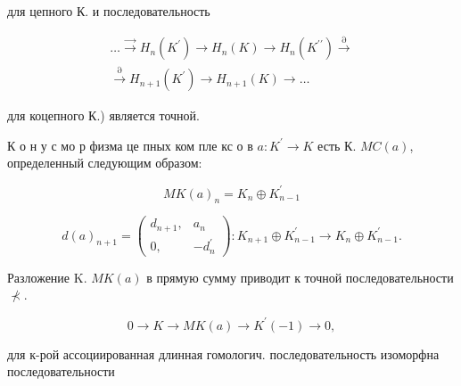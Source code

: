 \documentclass[10pt]{article}
\begin{document}
для цепного К. и последовательность



\[

\begin{gathered}

\ldots \stackrel{\longrightarrow}{\longrightarrow} H_{n}\left(K^{\prime}\right) \longrightarrow H_{n}(K) \longrightarrow H_{n}\left(K^{\prime \prime}\right) \stackrel{\partial}{\longrightarrow} \\

\stackrel{\partial}{\longrightarrow} H_{n+1}\left(K^{\prime}\right) \longrightarrow H_{n+1}(K) \longrightarrow \ldots

\end{gathered}

\]



для коцепного К.) является точной.



К о н у с мо р физма це пных ком пле кс о в $a: K^{\prime} \rightarrow K$ есть К. $M C(a)$, определенный следующим образом:



\[

M K(a)_{n}=K_{n} \oplus K_{n-1}^{\prime}

\]



\[

d(a)_{n+1}=\left(\begin{array}{cc}

d_{n+1}, & a_{n} \\

0, & -d_{n}^{\prime}

\end{array}\right): K_{n+1} \oplus K_{n-1}^{\prime} \longrightarrow K_{n} \oplus K_{n-1}^{\prime} .

\]



Разложение $\mathrm{K}$. $M K(a)$ в прямую сумму приводит к точной последовательности $\nprec$.



\[

0 \rightarrow K \rightarrow M K(a) \rightarrow K^{\prime}(-1) \rightarrow 0,

\]



для к-рой ассоциированная длинная гомологич. последовательность изоморфна последовательности
\end{document}
